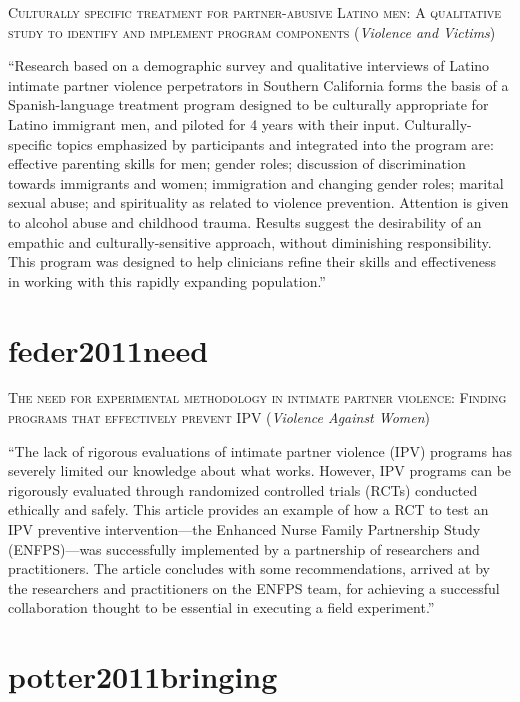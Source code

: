 \documentclass[]{tufte-handout}
\begin{document}
\textsc{\large{Culturally specific treatment for partner-abusive Latino men: A qualitative study to identify and implement program components}}
(\emph{Violence and Victims})

``Research based on a demographic survey and qualitative interviews of
Latino intimate partner violence perpetrators in Southern California
forms the basis of a Spanish-language treatment program designed to be
culturally appropriate for Latino immigrant men, and piloted for 4 years
with their input. Culturally-specific topics emphasized by participants
and integrated into the program are: effective parenting skills for men;
gender roles; discussion of discrimination towards immigrants and women;
immigration and changing gender roles; marital sexual abuse; and
spirituality as related to violence prevention. Attention is given to
alcohol abuse and childhood trauma. Results suggest the desirability of
an empathic and culturally-sensitive approach, without diminishing
responsibility. This program was designed to help clinicians refine
their skills and effectiveness in working with this rapidly expanding
population.''

\section{\texorpdfstring{\textcolor[HTML]{5b0057}{feder2011need}}{}}\label{section-16}

\textsc{\large{The need for experimental methodology in intimate partner violence: Finding programs that effectively prevent IPV}}
(\emph{Violence Against Women})

``The lack of rigorous evaluations of intimate partner violence (IPV)
programs has severely limited our knowledge about what works. However,
IPV programs can be rigorously evaluated through randomized controlled
trials (RCTs) conducted ethically and safely. This article provides an
example of how a RCT to test an IPV preventive intervention---the
Enhanced Nurse Family Partnership Study (ENFPS)---was successfully
implemented by a partnership of researchers and practitioners. The
article concludes with some recommendations, arrived at by the
researchers and practitioners on the ENFPS team, for achieving a
successful collaboration thought to be essential in executing a field
experiment.''

\section{\texorpdfstring{\textcolor[HTML]{5b0057}{potter2011bringing}}{}}\label{section-17}
\end{document}
